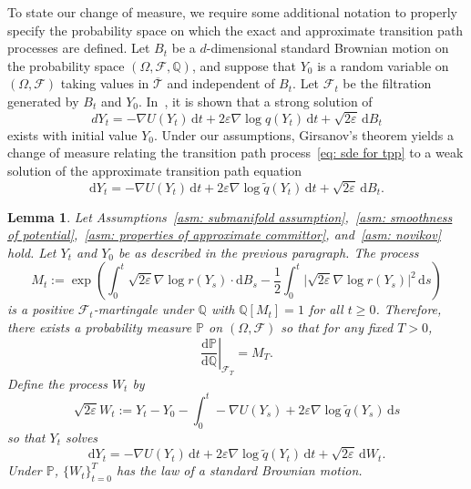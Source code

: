 \documentclass[reqno]{amsart}
\newcommand{\eps}{\varepsilon}
\newcommand{\1}{\mathds{1}}
\renewcommand{\d}{\mathrm{d}}
\newcommand{\grad}{\nabla}
\renewcommand{\P}{\mathds{P}}
\newcommand{\Q}{\mathds{Q}}
\newcommand{\F}{\mathcal{F}}
\newcommand{\zed}{M}
\newtheorem{lemma}{Lemma}
\theoremstyle{definition}
\theoremstyle{remark}
\newcommand{\D}{\mathscr{T}}
\begin{document}
 To state our change of measure, we require some additional notation to properly specify the probability space on which the exact and approximate transition path processes are defined. Let $B_t$ be a $d$-dimensional standard Brownian motion on the probability space $(\Omega, \F, \Q)$, and suppose that $Y_0$ is a random variable on $(\Omega, \F)$ taking values in $\overline{\D}$ and independent of $B_t$. Let $\F_t$ be the filtration generated by $B_t$ and $Y_0$. In~\cite{lu_reactive_2015}, it is shown that a strong solution of
\begin{equation}\label{eq: sde for tpp}
  dY_t = -\grad U(Y_t) \, \d t + 2 \eps \grad \log q(Y_t) \, \d t + \sqrt{2\eps} \, \d B_t
\end{equation}
exists with initial value $Y_0$. 
Under our assumptions, Girsanov's theorem yields a change of measure relating the transition path process~\eqref{eq: sde for tpp} to a weak solution of the approximate transition path equation
\begin{equation*}
  \d Y_t = -\grad U (Y_t) \, \d t + 2 \eps \grad \log \tilde q(Y_t) \, \d t + \sqrt{2 \eps} \, \d B_t.
\end{equation*}

\begin{lemma}\label{lem: impractical general change of measure formula}
 Let Assumptions~\ref{asm: submanifold assumption},~\ref{asm: smoothness of potential},~\ref{asm: properties of approximate committor}, and~\ref{asm: novikov} hold. Let $Y_t$ and $Y_0$ be as described in the previous paragraph. The process
  \begin{equation}\label{eqn: first formula for z}
    \zed_t := \exp \left ( \int_0^t \sqrt{2 \eps} \grad \log r(Y_s) \cdot \d B_s - \frac12 \int_0^t \lvert \sqrt{2 \eps} \grad \log r(Y_s) \rvert^2 \, \d s \right )
  \end{equation}
  is a positive $\F_t$-martingale under $\Q$ with $\Q [\zed_t] = 1$ for all $t\geq 0$. Therefore, there exists a probability measure $\P$ on $(\Omega, \F)$ so that for any fixed $T>0$,
  \begin{equation*}
    \left . \frac{\d \P}{\d \Q} \right \rvert_{\F_T} = \zed_T.
  \end{equation*}
  Define the process $W_t$  by
  \begin{equation*}
     \sqrt{2 \eps} W_t := Y_t - Y_0 - \int_0^t -\grad U(Y_s) + 2 \eps\grad \log \tilde q(Y_s) \, \d s
   \end{equation*}
   so that $Y_t$ solves
   \begin{equation*}
    \d Y_t =  -\grad U(Y_t) \, \d t + 2 \eps \grad \log \tilde q(Y_t) \, \d t + \sqrt{2 \eps} \, \d W_t.
  \end{equation*}
  Under $\P$, $\{W_t\}_{t=0}^T$ has the law of a standard Brownian motion.
\end{lemma}
\end{document}
